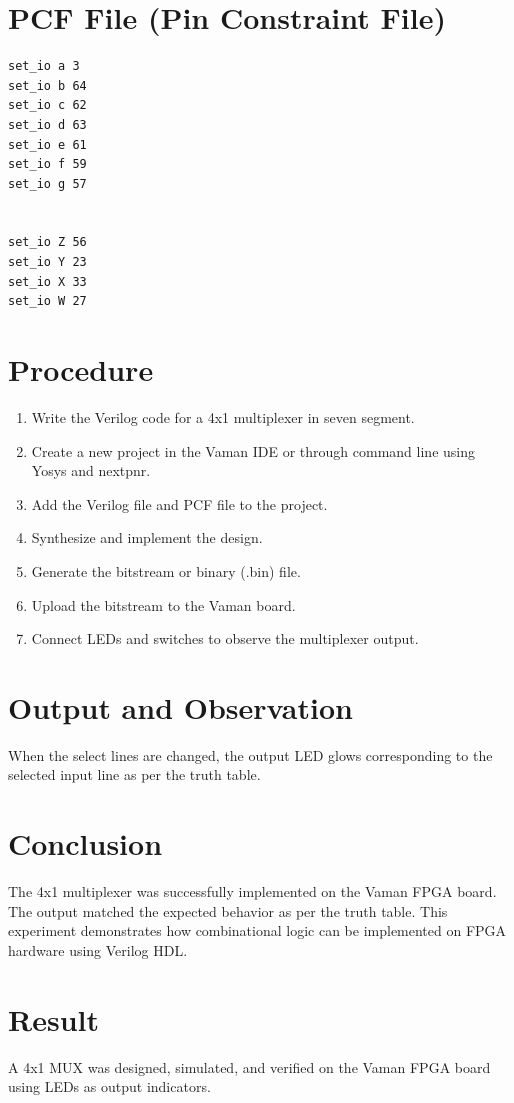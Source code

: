 \documentclass[a4paper,12pt]{article}
\begin{document}
\section*{PCF File (Pin Constraint File)}
\begin{lstlisting}[style=verilog, caption={.pcf File for Vaman Board Pin Mapping}]
set_io a 3
set_io b 64
set_io c 62
set_io d 63
set_io e 61
set_io f 59
set_io g 57


set_io Z 56
set_io Y 23
set_io X 33
set_io W 27
\end{lstlisting}

\section*{Procedure}
\begin{enumerate}
    \item Write the Verilog code for a 4x1 multiplexer in seven segment.
    \item Create a new project in the Vaman IDE or through command line using Yosys and nextpnr.
    \item Add the Verilog file and PCF file to the project.
    \item Synthesize and implement the design.
    \item Generate the bitstream or binary (.bin) file.
    \item Upload the bitstream to the Vaman board.
    \item Connect LEDs and switches to observe the multiplexer output.
\end{enumerate}

\section*{Output and Observation}
When the select lines are changed, the output LED glows corresponding to the selected input line as per the truth table.

\section*{Conclusion}
The 4x1 multiplexer was successfully implemented on the Vaman FPGA board. The output matched the expected behavior as per the truth table. This experiment demonstrates how combinational logic can be implemented on FPGA hardware using Verilog HDL.

\section*{Result}
A 4x1 MUX was designed, simulated, and verified on the Vaman FPGA board using LEDs as output indicators.
\end{document}
